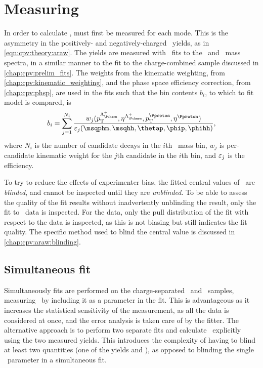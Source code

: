 \chapter{Measuring \texorpdfstring{\ARaw}{ARaw}}
\label{chap:cpv:araw}

In order to calculate \dACP, \ARaw must first be measured for each mode.
This is the asymmetry in the positively- and negatively-charged \PLambdac\ 
yields, as in \cref{eqn:cpv:theory:araw}.
The yields are measured with \chisq\ fits to the \PLambdac\ and \APLambdac\ 
mass spectra, in a similar manner to the fit to the charge-combined sample 
discussed in \cref{chap:cpv:prelim_fits}.
The weights from the kinematic weighting, from 
\cref{chap:cpv:kinematic_weighting}, and the phase space efficiency correction, 
from \cref{chap:cpv:phsp}, are used in the fits such that the bin contents 
$b_{i}$, to which to fit model is compared, is
\begin{equation}
  b_{i} = \sum_{j = 1}^{N_{i}} \frac{%
    w_{j}(\pT^{\PLambdac}, \Eta^{\PLambdac},
          \pT^{\Pproton}, \Eta^{\Pproton})
  }{%
    \eff_{j}(\msqphm, \msqhh, \thetap, \phip, \phihh)
  },
\end{equation}
where $N_{i}$ is the number of candidate decays in the $i$th \phh\ mass bin, 
$w_{j}$ is per-candidate kinematic weight for the $j$th candidate in the $i$th 
bin, and $\varepsilon_{j}$ is the efficiency.

To try to reduce the effects of experimenter bias, the fitted central values of 
\ARaw\ are \emph{blinded}, and cannot be inspected until they are 
\emph{unblinded}.
To be able to assess the quality of the fit results without inadvertently 
unblinding the result, only the fit to \PLambdac\ data is inspected.
For the \APLambdac data, only the pull distribution of the fit with respect to 
the data is inspected, as this is not biasing but still indicates the fit 
quality.
The specific method used to blind the central value is discussed in 
\cref{chap:cpv:araw:blinding}.

\section{Simultaneous fit}
\label{chap:cpv:araw:simultaneous_fit}

Simultaneously fits are performed on the charge-separated \PLambdac\ and 
\APLambdac\ samples, measuring \ARaw\ by including it as a parameter in the 
fit.
This is advantageous as it increases the statistical sensitivity of the 
measurement, as all the data is considered at once, and the error analysis is 
taken care of by the fitter.
The alternative approach is to perform two separate fits and calculate \ARaw\ 
explicitly using the two measured yields.
This introduces the complexity of having to blind at least two quantities (one 
of the yields and \ARaw), as opposed to blinding the single \ARaw\ parameter in 
a simultaneous fit.

